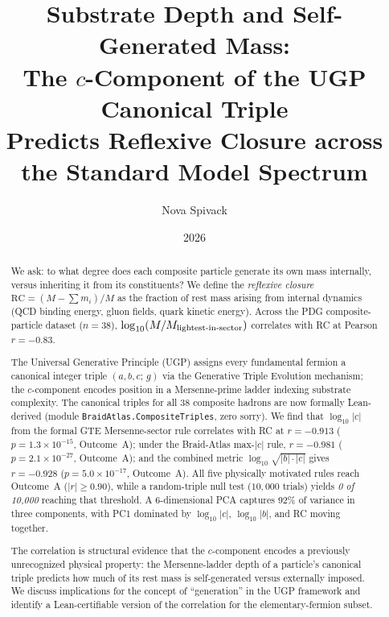 \documentclass[12pt,a4paper]{article}
\title{\bfseries Substrate Depth and Self-Generated Mass:\\
The $c$-Component of the UGP Canonical Triple\\
Predicts Reflexive Closure across the Standard Model Spectrum}
\author{Nova Spivack}
\affil{Independent Research}
\date{2026}
\newcommand{\RC}{\ensuremath{\mathrm{RC}}}
\begin{document}
\maketitle
\NovaZenodoAfterTitle

\begin{abstract}
We ask: to what degree does each composite particle generate its own mass
internally, versus inheriting it from its constituents?
We define the \emph{reflexive closure} $\RC = (M - \sum m_i)/M$ as the
fraction of rest mass arising from internal dynamics (QCD binding energy,
gluon fields, quark kinetic energy).
Across the PDG composite-particle dataset ($n=38$), $\log_{10}(M/M_{\rm
lightest\text{-}in\text{-}sector})$ correlates with RC at Pearson $r = -0.83$.

The Universal Generative Principle (UGP) assigns every fundamental fermion
a canonical integer triple $(a,b,c;\,g)$ via the Generative Triple Evolution
mechanism; the $c$-component encodes position in a Mersenne-prime ladder
indexing substrate complexity.
The canonical triples for all 38 composite hadrons are now formally
Lean-derived (module \texttt{BraidAtlas.CompositeTriples}, zero sorry).
We find that $\log_{10}|c|$ from the formal GTE Mersenne-sector rule
correlates with RC at $r = -0.913$ ($p = 1.3\times10^{-15}$, Outcome~A);
under the Braid-Atlas max-$|c|$ rule, $r = -0.981$ ($p = 2.1\times10^{-27}$,
Outcome~A); and the combined metric $\log_{10}\!\sqrt{|b|\cdot|c|}$ gives
$r = -0.928$ ($p = 5.0\times10^{-17}$, Outcome~A).
All five physically motivated rules reach Outcome~A ($|r|\geq0.90$),
while a random-triple null test ($10{,}000$ trials) yields
\emph{0 of 10{,}000} reaching that threshold.
A 6-dimensional PCA captures 92\% of variance in three components,
with PC1 dominated by $\log_{10}|c|$, $\log_{10}|b|$, and RC moving together.

The correlation is structural evidence that the $c$-component encodes a
previously unrecognized physical property: the Mersenne-ladder depth of a
particle's canonical triple predicts how much of its rest mass is
self-generated versus externally imposed.
We discuss implications for the concept of ``generation'' in the UGP framework
and identify a Lean-certifiable version of the correlation for the
elementary-fermion subset.
\end{abstract}

\tableofcontents
\newpage
\end{document}
